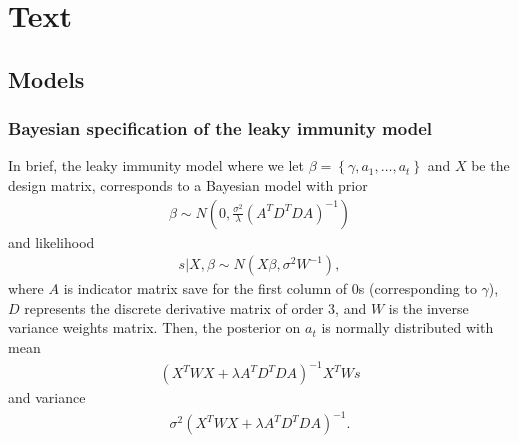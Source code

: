 \documentclass{article}
\begin{document}
\section{Text}  
\subsection{Models}
\subsubsection{Bayesian specification of the leaky immunity model}\label{supp:bayesleaky}
In brief, the leaky immunity model where we let $\beta = \left \{  \gamma, a_1,\dots, a_t \right \}$ and $X$ be the design matrix, corresponds to a Bayesian model with prior 
\begin{align*}
    \beta \sim N\left ( 0,  \frac{\sigma^2 }{ \lambda} \left ( A^TD^TDA \right ) ^{-1}  \right )
\end{align*} and likelihood 
\begin{align*}
    s|X,\beta \sim N \left( X\beta, \sigma^2W^{-1} \right ),
\end{align*} where $A$ is indicator matrix save for the first column of $0$s (corresponding to $\gamma$), $D$ represents the discrete derivative matrix of order $3$, and $W$ is the inverse variance weights matrix. Then, the posterior on $a_t$ is normally distributed with mean 
\begin{align*}
    \left ( X^TWX + \lambda A^TD^TDA \right )^{-1}X^TWs
\end{align*} 
and variance 
\begin{align*}
    \sigma^2 (X^TWX + \lambda A^TD^TDA)^{-1}.
\end{align*}
\end{document}
